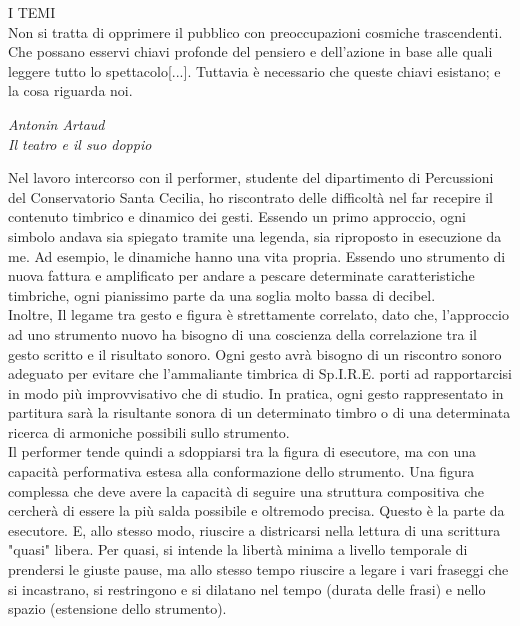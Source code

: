\epigraph{I TEMI \\ Non si tratta di opprimere il pubblico con preoccupazioni cosmiche trascendenti. Che possano esservi chiavi profonde del pensiero e dell'azione in base alle quali leggere tutto lo spettacolo[...]. Tuttavia è necessario che queste chiavi esistano; e la cosa riguarda noi.}{\textit{Antonin Artaud \\ Il teatro e il suo doppio}}

Nel lavoro intercorso con il performer, studente del dipartimento di Percussioni del Conservatorio Santa Cecilia, ho riscontrato delle difficoltà nel far recepire il contenuto timbrico e dinamico dei gesti. Essendo un primo approccio, ogni simbolo andava sia spiegato tramite una legenda, sia riproposto in esecuzione da me. Ad esempio, le dinamiche hanno una vita propria. Essendo uno strumento di nuova fattura e amplificato per andare a pescare determinate caratteristiche timbriche, ogni pianissimo parte da una soglia molto bassa di decibel. \\
Inoltre, Il legame tra gesto e figura è strettamente correlato, dato che, l'approccio ad uno strumento nuovo ha bisogno di una coscienza della correlazione tra il gesto scritto e il risultato sonoro. Ogni gesto avrà bisogno di un riscontro sonoro adeguato per evitare che l'ammaliante timbrica di Sp.I.R.E. porti ad rapportarcisi in modo più improvvisativo che di studio. In pratica, ogni gesto rappresentato in partitura sarà la risultante sonora di un determinato timbro o di una determinata ricerca di armoniche possibili sullo strumento. \\
Il performer tende quindi a sdoppiarsi tra la figura di esecutore, ma con una capacità performativa estesa alla conformazione dello strumento. Una figura complessa che deve avere la capacità di seguire una struttura compositiva che cercherà di essere la più salda possibile e oltremodo precisa. Questo è la parte da esecutore. E, allo stesso modo, riuscire a districarsi nella lettura di una scrittura "quasi" libera. Per quasi, si intende la libertà minima a livello temporale di prendersi le giuste pause, ma allo stesso tempo riuscire a legare i vari fraseggi che si incastrano, si restringono e si dilatano nel tempo (durata delle frasi) e nello spazio (estensione dello strumento).

